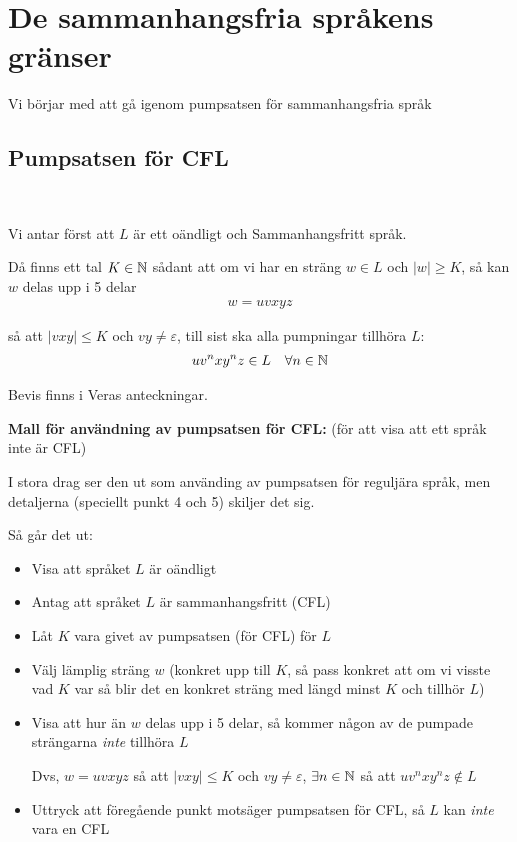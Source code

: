 \section{De sammanhangsfria språkens gränser}\par
\noindent Vi börjar med att gå igenom pumpsatsen för sammanhangsfria språk
\par\bigskip
\subsection{Pumpsatsen för CFL}\hfill\\\par
\noindent Vi antar först att $L$ är ett oändligt och Sammanhangsfritt språk.\par
\noindent Då finns ett tal $K\in\mathbb{N}$ sådant att om vi har en sträng $w\in L$ och $\left|w\right|\geq K$, så kan $w$ delas upp i 5 delar
\begin{equation*}
  \begin{gathered}
    w=uvxyz
  \end{gathered}
\end{equation*}\par
\noindent så att $\left|vxy\right|\leq K$ och $vy\neq\varepsilon$, till sist ska alla pumpningar tillhöra $L$:
\begin{equation*}
  \begin{gathered}
    uv^nxy^nz\in L\quad \forall n\in\mathbb{N}
  \end{gathered}
\end{equation*}\par
\noindent Bevis finns i Veras anteckningar. 
\par\bigskip
\noindent\textbf{Mall för användning av pumpsatsen för CFL:} (för att visa att ett språk inte är CFL)
\par\bigskip
\noindent I stora drag ser den ut som använding av pumpsatsen för reguljära språk, men detaljerna (speciellt punkt 4 och 5) skiljer det sig.
\par\bigskip
\noindent Så går det ut:\par
\begin{itemize}
  \item Visa att språket $L$ är oändligt
  \item Antag att språket $L$ är sammanhangsfritt (CFL)
  \item Låt $K$ vara givet av pumpsatsen (för CFL) för $L$
  \item Välj lämplig sträng $w$ (konkret upp till $K$, så pass konkret att om vi visste vad $K$ var så blir det en konkret sträng med längd minst $K$ och tillhör $L$)
  \item Visa att hur än $w$ delas upp i 5 delar, så kommer någon av  de pumpade strängarna \textit{inte} tillhöra $L$ \par
    \noindent Dvs, $w = uvxyz$ så att $\left|vxy\right|\leq K$ och $vy\neq\varepsilon$, $\exists n\in\mathbb{N}$ så att $uv^nxy^nz\notin L$
  \item Uttryck att föregående punkt motsäger pumpsatsen för CFL, så $L$ kan \textit{inte} vara en CFL 
\end{itemize}
